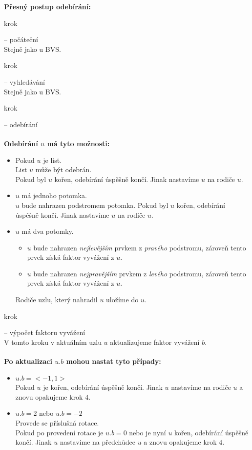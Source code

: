 \documentclass[
  biblatex=false,
  font=serif,
  glossaries=false,
  tables=false,
  theorems=false,
  index
]{kidiplom}
\begin{document}
\newpage
\noindent \textbf{Přesný postup odebírání:}
\begin{enumerate} {\bfseries
\item  krok} -- počáteční \\
Stejně jako u BVS.
{\bfseries\item  krok} -- vyhledávání \\
Stejně jako u BVS.
{\bfseries\item  krok} -- odebírání \\\\
\textbf{Odebírání $u$ má tyto možnosti:}
\begin{itemize}
\item Pokud $u$ je list. \\
List $u$ může být odebrán. \\
Pokud byl $u$ kořen, odebírání úspěšně končí. Jinak nastavíme $u$ na rodiče $u$.
\item $u$ má jednoho potomka. \\
$u$ bude nahrazen podstromem potomka.
Pokud byl $u$ kořen, odebírání úspěšně končí. Jinak nastavíme $u$ na rodiče $u$.
\item $u$ má dva potomky. 
\begin{itemize}
\item $u$ bude nahrazen \textit{nejlevějším} prvkem z \textit{pravého} podstromu, zároveň tento prvek získá faktor vyvážení z $u$.
\item $u$ bude nahrazen \textit{nejpravějším} prvkem z \textit{levého} podstromu, zároveň tento prvek získá faktor vyvážení z $u$.
\end{itemize}
Rodiče uzlu, který nahradil $u$ uložíme do $u$.
\end{itemize}
{\bfseries\item  krok} -- výpočet faktoru vyvážení \\
V tomto kroku v aktuálním uzlu $u$ aktualizujeme faktor vyvážení $b$.\\\\
\textbf{Po aktualizaci $u.b$ mohou nastat tyto případy:}
\begin{itemize}
\item $u.b = <-1,1>$\\
Pokud $u$ je kořen, odebírání úspěšně končí. Jinak $u$ nastavíme na rodiče $u$ a znovu opakujeme krok 4.
\item $u.b = 2$ nebo $u.b = -2$\\
Provede se příslušná rotace.\\
Pokud po provedení rotace je $u.b = 0$ nebo je nyní $u$ kořen, odebírání úspěšně končí. Jinak $u$ nastavíme na předchůdce $u$ a znovu opakujeme krok 4.
\end{itemize}
\end{enumerate}
\end{document}
